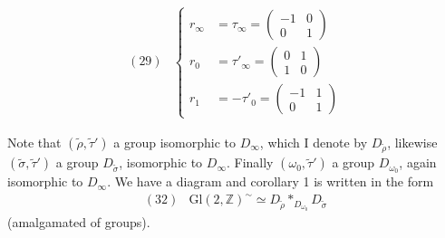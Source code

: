 
\[
\begin{array}{ll}
(29)&\left\{
\begin{aligned}
r_\infty&=\tau_\infty=\begin{pmatrix}-1&0\\0&1\end{pmatrix}\\
r_0&=\tau'_\infty=\begin{pmatrix}0&1\\1&0\end{pmatrix}\\
r_1&=-\tau'_0=\begin{pmatrix}-1&1\\0&1\end{pmatrix}
\end{aligned}
\right.
\end{array}
\]
\margin{$\left[\begin{array}{ll}
(30)&\left\{
\begin{aligned}
r_0(\rho)&=\rho^{-1},\quad r_0(\sigma)=\sigma^{-1}\\
r_1&=\rho^{-1}r_0=r_0\rho\\
r_\infty&=\sigma r_0=r_0\sigma^{-1}
\end{aligned}\right.
\end{array}\right.$}

Note that $(\widetilde\rho,\widetilde\tau')$  a group isomorphic to $D_\infty$, which I denote by $D_{\widetilde\rho}$,
likewise $(\widetilde\sigma,\widetilde\tau')$  a group $D_{\widetilde\sigma}$,
isomorphic to $D_\infty$. Finally $(\omega_0,\widetilde\tau')$  a group $D_{\omega_0}$, again isomorphic to $D_\infty$. We have a diagram
and corollary 1 is written in the form
\[
\begin{array}{ll}
(32)&\mathrm{Gl}(2,\mathbb Z)^{\sim}\simeq D_{\widetilde\rho}*_{D_{\omega_0}}D_{\widetilde\sigma}
\end{array}
\]
(amalgamated  of groups).

